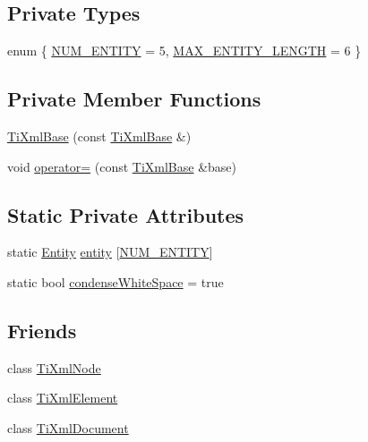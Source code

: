 \subsection*{Private Types}
\begin{DoxyCompactItemize}
\item 
enum \{ \hyperlink{class_ti_xml_base_a99a2fe4c7ab51f1be33d349c5fd382e8ab848893c6d03fcd8f42941d7079ccb47}{N\+U\+M\+\_\+\+E\+N\+T\+I\+TY} = 5, 
\hyperlink{class_ti_xml_base_a99a2fe4c7ab51f1be33d349c5fd382e8aeb571e41586d47e28f60445cb9b41d49}{M\+A\+X\+\_\+\+E\+N\+T\+I\+T\+Y\+\_\+\+L\+E\+N\+G\+TH} = 6
 \}
\end{DoxyCompactItemize}
\subsection*{Private Member Functions}
\begin{DoxyCompactItemize}
\item 
\hyperlink{class_ti_xml_base_a626975d7fb27b0a471142ca582b561b4}{Ti\+Xml\+Base} (const \hyperlink{class_ti_xml_base}{Ti\+Xml\+Base} \&)
\item 
void \hyperlink{class_ti_xml_base_a183315aa6f1bb36d509b179e912cb93f}{operator=} (const \hyperlink{class_ti_xml_base}{Ti\+Xml\+Base} \&base)
\end{DoxyCompactItemize}
\subsection*{Static Private Attributes}
\begin{DoxyCompactItemize}
\item 
static \hyperlink{struct_ti_xml_base_1_1_entity}{Entity} \hyperlink{class_ti_xml_base_aae956c75fedff20d337f7cc109c6b71a}{entity} \mbox{[}\hyperlink{class_ti_xml_base_a99a2fe4c7ab51f1be33d349c5fd382e8ab848893c6d03fcd8f42941d7079ccb47}{N\+U\+M\+\_\+\+E\+N\+T\+I\+TY}\mbox{]}
\item 
static bool \hyperlink{class_ti_xml_base_a447a05f6a3edbb7892f66f9df8244a3d}{condense\+White\+Space} = true
\end{DoxyCompactItemize}
\subsection*{Friends}
\begin{DoxyCompactItemize}
\item 
class \hyperlink{class_ti_xml_base_a218872a0d985ae30e78c55adc4bdb196}{Ti\+Xml\+Node}
\item 
class \hyperlink{class_ti_xml_base_ab6592e32cb9132be517cc12a70564c4b}{Ti\+Xml\+Element}
\item 
class \hyperlink{class_ti_xml_base_a173617f6dfe902cf484ce5552b950475}{Ti\+Xml\+Document}
\end{DoxyCompactItemize}



